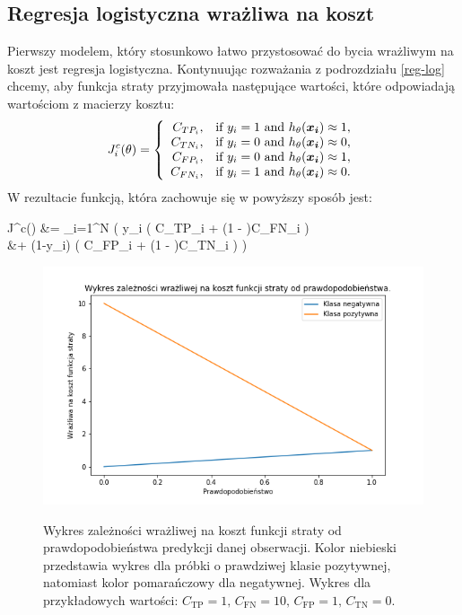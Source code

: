 \documentclass[openany]{book}
\begin{document}
\subsection{Regresja logistyczna wrażliwa na koszt}
		Pierwszy modelem, który stosunkowo łatwo przystosować do bycia wrażliwym na koszt jest regresja logistyczna. Kontynuując rozważania z podrozdziału \ref{reg-log} chcemy, aby funkcja straty przyjmowała następujące wartości, które odpowiadają wartościom z macierzy kosztu:
		$$
		J^c_i(\theta)=\left\{
		\begin{array}{rl}
		C_{TP_i}, &\mbox{if $y_i = 1$ and $h_{\theta}(\boldsymbol{x_i}) \approx 1$}, \\
		C_{TN_i}, &\mbox{if $y_i = 0$ and $h_{\theta}(\boldsymbol{x_i}) \approx 0$}, \\
		C_{FP_i}, &\mbox{if $y_i = 0$ and $h_{\theta}(\boldsymbol{x_i}) \approx 1$}, \\
		C_{FN_i}, &\mbox{if $y_i = 1$ and $h_{\theta}(\boldsymbol{x_i}) \approx 0$}.
		\end{array}
		\right.
		$$
		W rezultacie funkcją, która zachowuje się w powyższy sposób jest:
		\begin{talign*}
			J^c(\theta) &=  \sum_{i=1}^{N} \bigg( y_i \Big( \htx C_{TP_i} + (1 - \htx)C_{FN_i} \Big) \\
			&+ (1-y_i) \Big( \htx C_{FP_i} + (1 - \htx)C_{TN_i} \Big) \bigg)
		\end{talign*}
		
		\begin{figure}
			\includegraphics[width=\linewidth]{images/cost_sensitive_ce.png}
			\label{cost-sensitive-loss-function}
			\caption{Wykres zależności wrażliwej na koszt funkcji straty od prawdopodobieństwa predykcji danej obserwacji. Kolor niebieski przedstawia wykres dla próbki o prawdziwej klasie pozytywnej, natomiast kolor pomarańczowy dla negatywnej. Wykres dla przykładowych wartości: $C_{\text{TP}} = 1 \text{, } C_{\text{FN}} = 10 \text{, } C_{\text{FP}} = 1 \text{, } C_{\text{TN}} = 0$.}
		\end{figure}
	
\end{document}
